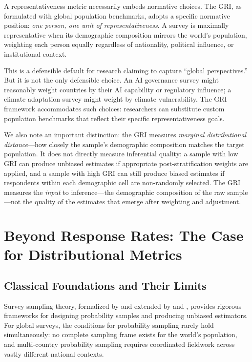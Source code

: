 \documentclass[11pt,a4paper]{article}
\begin{document}
A representativeness metric necessarily embeds normative choices. The GRI, as formulated with global population benchmarks, adopts a specific normative position: \emph{one person, one unit of representativeness}. A survey is maximally representative when its demographic composition mirrors the world's population, weighting each person equally regardless of nationality, political influence, or institutional context.

This is a defensible default for research claiming to capture ``global perspectives.'' But it is not the only defensible choice. An AI governance survey might reasonably weight countries by their AI capability or regulatory influence; a climate adaptation survey might weight by climate vulnerability. The GRI framework accommodates such choices: researchers can substitute custom population benchmarks that reflect their specific representativeness goals.

We also note an important distinction: the GRI measures \emph{marginal distributional distance}---how closely the sample's demographic composition matches the target population. It does not directly measure inferential quality: a sample with low GRI can produce unbiased estimates if appropriate post-stratification weights are applied, and a sample with high GRI can still produce biased estimates if respondents within each demographic cell are non-randomly selected. The GRI measures the \emph{input} to inference---the demographic composition of the raw sample---not the quality of the estimates that emerge after weighting and adjustment.

\section{Beyond Response Rates: The Case for Distributional Metrics}

\subsection{Classical Foundations and Their Limits}

Survey sampling theory, formalized by \citet{neyman1934two} and extended by \citet{kish1965survey} and \citet{horvitz1952generalization}, provides rigorous frameworks for designing probability samples and producing unbiased estimators. For global surveys, the conditions for probability sampling rarely hold simultaneously: no complete sampling frame exists for the world's population, and multi-country probability sampling requires coordinated fieldwork across vastly different national contexts.
\end{document}

